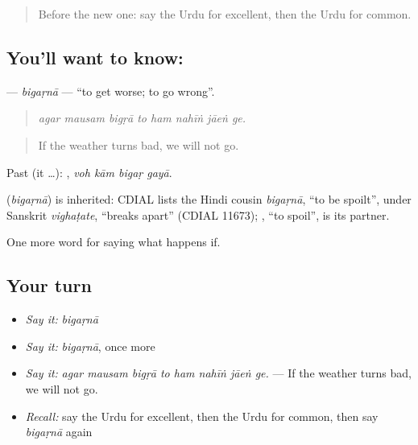\label{lesson:UR-C377-bigarna-worsen}



\begin{quote}
Before the new one: say the Urdu for excellent, then the Urdu for common.
\end{quote}

\subsection*{You'll want to know: }
\textbf{} — \emph{bigaṛnā} — \textquotedblleft{}to get worse; to go wrong\textquotedblright{}.

\begin{quote}
       
\end{quote}

\begin{quote}
\emph{agar mausam bigṛā to ham nahīṅ jāeṅ ge.}
\end{quote}

\begin{quote}
If the weather turns bad, we will not go.
\end{quote}

Past (it …):    , \emph{voh kām bigaṛ gayā}.

\begin{cousinweb}
\textbf{} (\emph{bigaṛnā}) is inherited: CDIAL lists the Hindi cousin \emph{bigaṛnā}, \textquotedblleft{}to be spoilt\textquotedblright{}, under Sanskrit \emph{vighaṭate}, \textquotedblleft{}breaks apart\textquotedblright{} (CDIAL 11673); \textbf{}, \textquotedblleft{}to spoil\textquotedblright{}, is its partner.
\end{cousinweb}

\begin{grammarlens}[title={What you've built}]
One more word for saying what happens if.
\end{grammarlens}

\subsection*{Your turn}
\begin{itemize}
\raggedright
  \item \emph{Say it:} \emph{bigaṛnā}
  \item \emph{Say it:} \emph{bigaṛnā}, once more
  \item \emph{Say it:} \emph{agar mausam bigṛā to ham nahīṅ jāeṅ ge.} — If the weather turns bad, we will not go.
  \item \emph{Recall:} say the Urdu for excellent, then the Urdu for common, then say \emph{bigaṛnā} again
\end{itemize}

